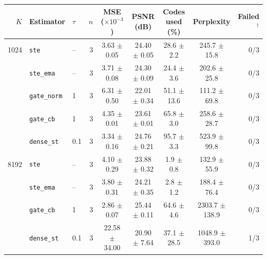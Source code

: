 \begin{tabular}{rllrccccr}
\toprule
$K$ & Estimator & $\tau$ & $n$ & MSE ($\times 10^{-3}$) & PSNR (dB) & Codes used (\%) & Perplexity & Failed$^\dagger$ \\
\midrule
1024 & \texttt{ste} & -- & 3 & 3.63 $\pm$ 0.05 & 24.40 $\pm$ 0.05 & 28.6 $\pm$ 2.2 & 245.7 $\pm$ 15.8 & 0/3 \\
 & \texttt{ste\_ema} & -- & 3 & 3.71 $\pm$ 0.08 & 24.30 $\pm$ 0.09 & 24.4 $\pm$ 3.6 & 202.6 $\pm$ 25.8 & 0/3 \\
 & \texttt{gate\_norm} & 1 & 3 & 6.31 $\pm$ 0.50 & 22.01 $\pm$ 0.34 & 51.1 $\pm$ 13.6 & 111.2 $\pm$ 69.8 & 0/3 \\
 & \texttt{gate\_cb} & 1 & 3 & 4.35 $\pm$ 0.01 & 23.61 $\pm$ 0.01 & 65.8 $\pm$ 3.0 & 258.6 $\pm$ 28.7 & 0/3 \\
 & \texttt{dense\_st} & 0.1 & 3 & 3.34 $\pm$ 0.16 & 24.76 $\pm$ 0.21 & 95.7 $\pm$ 3.3 & 523.9 $\pm$ 99.8 & 0/3 \\
\midrule
8192 & \texttt{ste} & -- & 3 & 4.10 $\pm$ 0.29 & 23.88 $\pm$ 0.32 & 1.9 $\pm$ 0.8 & 132.9 $\pm$ 55.9 & 0/3 \\
 & \texttt{ste\_ema} & -- & 3 & 3.80 $\pm$ 0.31 & 24.21 $\pm$ 0.35 & 2.8 $\pm$ 1.2 & 188.4 $\pm$ 76.4 & 0/3 \\
 & \texttt{gate\_cb} & 1 & 3 & 2.86 $\pm$ 0.07 & 25.44 $\pm$ 0.11 & 64.6 $\pm$ 4.6 & 2303.7 $\pm$ 138.9 & 0/3 \\
 & \texttt{dense\_st} & 0.1 & 3 & 22.58 $\pm$ 34.00 & 20.90 $\pm$ 7.64 & 37.1 $\pm$ 28.5 & 1048.9 $\pm$ 393.0 & 1/3 \\
\bottomrule
\end{tabular}
